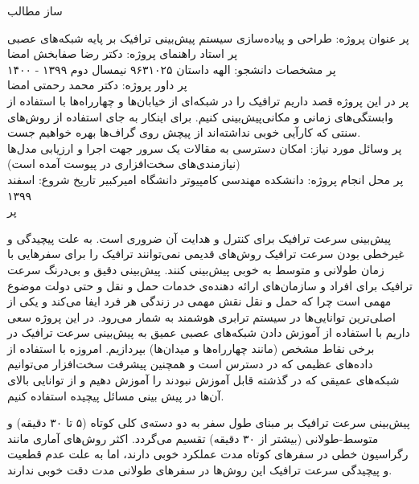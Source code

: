 \documentclass{article}
\begin{document}
\setLTRbibitems{}

‌ساز
‌مطالب



‌پر
عنوان پروژه: طراحی و پیاده‌سازی سیستم پیش‌بینی ترافیک بر پایه شبکه‌های عصبی\\
‌پر
استاد راهنما‌ی پروژه:‌ دکتر رضا صفابخش  امضا \\[0.5cm]
‌پر
مشخصات دانشجو:
 الهه داستان
 ۹۶۳۱۰۲۵
 نیمسال دوم ۱۳۹۹ - ۱۴۰۰
\\
‌پر
داور پروژه:‌ دکتر محمد رحمتی  امضا \\[0.5cm]
‌پر
در این پروژه قصد داریم ترافیک را در شبکه‌ای از خیابان‌ها و چهارراه‌ها با استفاده از وابستگی‌های زمانی و مکانی‌پیش‌بینی
کنیم. برای اینکار به جای استفاده از روش‌های سنتی که کارآیی خوبی نداشته‌اند از پیچش روی گراف‌ها بهره خواهیم جست. \\
‌پر
وسائل مورد نیاز:
 امکان دسترسی به مقالات
 یک سرور جهت اجرا و ارزیابی مدل‌ها (نیازمندی‌های سخت‌افزاری در پیوست آمده است)
 \\
‌پر
محل انجام پروژه:‌ دانشکده مهندسی کامپیوتر دانشگاه امیرکبیر  تاریخ شروع: اسفند ۱۳۹۹ \\
‌پر


پیش‌بینی سرعت ترافیک برای کنترل و هدایت آن ضروری است.
به علت پیچیدگی و غیرخطی بودن سرعت ترافیک روش‌های قدیمی نمی‌توانند ترافیک را برای سفرهایی با زمان طولانی و متوسط به خوبی پیش‌بینی کنند.
پیش‌بینی دقیق و بی‌درنگ سرعت ترافیک برای افراد و سازمان‌های ارائه دهنده‌ی خدمات حمل و نقل و حتی دولت موضوع مهمی است چرا که حمل و نقل نقش مهمی در زندگی هر فرد ایفا می‌کند و یکی از اصلی‌ترین توانایی‌ها در سیستم ترابری هوشمند  به شمار می‌رود.
در این پروژه سعی داریم با استفاده از آموزش دادن شبکه‌های عصبی عمیق به پیش‌بینی سرعت ترافیک در برخی نقاط مشخص (مانند چهارراه‌ها و میدان‌ها) بپردازیم.
امروزه با استفاده از داده‌های عظیمی که در دسترس است و همچنین پیشرفت سخت‌افزار می‌توانیم شبکه‌های عمیقی که در گذشته قابل آموزش نبودند را آموزش دهیم و از توانایی بالای آن‌ها در پیش بینی مسائل پیچیده استفاده کنیم.

پیش‌بینی سرعت ترافیک بر مبنای طول سفر به دو دسته‌ی کلی کوتاه (۵ تا ۳۰ دقیقه) ‌و متوسط-طولانی (بیشتر از ۳۰ دقیقه) تقسیم می‌گردد. اکثر روش‌های آماری مانند رگراسیون خطی در سفرهای کوتاه مدت عملکرد خوبی دارند، اما به علت عدم قطعیت و پیچیدگی سرعت ترافیک این روش‌ها در سفرهای طولانی مدت دقت خوبی ندارند.~
\end{document}
